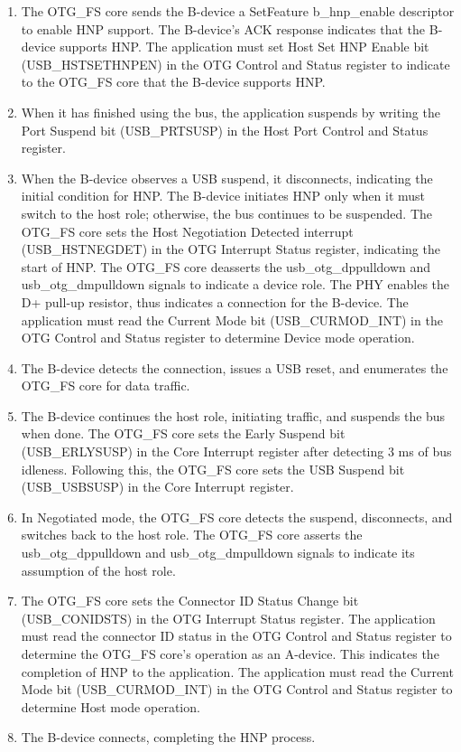 \documentclass[main\_\_EN.tex]{subfiles}
\begin{document}
\begin{enumerate}
    \item The OTG\_FS core sends the B-device a SetFeature b\_hnp\_enable descriptor to enable HNP support. The B-device’s ACK response indicates that the B-device supports HNP. The application must set Host Set HNP Enable bit (USB\_HSTSETHNPEN) in the OTG Control and Status register to indicate to the OTG\_FS core that the B-device supports HNP.
    \item When it has finished using the bus, the application suspends by writing the Port Suspend bit (USB\_PRTSUSP) in the Host Port Control and Status register.
    \item When the B-device observes a USB suspend, it disconnects, indicating the initial condition for HNP. The B-device initiates HNP only when it must switch to the host role; otherwise, the bus continues to be suspended. The OTG\_FS core sets the Host Negotiation Detected interrupt (USB\_HSTNEGDET) in the OTG Interrupt Status register, indicating the start of HNP. The OTG\_FS core deasserts the usb\_otg\_dppulldown and usb\_otg\_dmpulldown signals to indicate a device role. The PHY enables the D+ pull-up resistor, thus indicates a connection for the B-device. The application must read the Current Mode bit (USB\_CURMOD\_INT) in the OTG Control and Status register to determine Device mode operation.
    \item The B-device detects the connection, issues a USB reset, and enumerates the OTG\_FS core for data traffic.
    \item The B-device continues the host role, initiating traffic, and suspends the bus when done. The OTG\_FS core sets the Early Suspend bit (USB\_ERLYSUSP) in the Core Interrupt register after detecting 3 ms of bus idleness. Following this, the OTG\_FS core sets the USB Suspend bit (USB\_USBSUSP) in the Core Interrupt register.
    \item In Negotiated mode, the OTG\_FS core detects the suspend, disconnects, and switches back to the host role. The OTG\_FS core asserts the usb\_otg\_dppulldown and usb\_otg\_dmpulldown signals to indicate its assumption of the host role.
    \item The OTG\_FS core sets the Connector ID Status Change bit (USB\_CONIDSTS) in the OTG Interrupt Status register. The application must read the connector ID status in the OTG Control and Status register to determine the OTG\_FS core’s operation as an A-device. This indicates the completion of HNP to the application. The application must read the Current Mode bit (USB\_CURMOD\_INT) in the OTG Control and Status register to determine Host mode operation.
    \item The B-device connects, completing the HNP process.
\end{enumerate}
\end{document}
